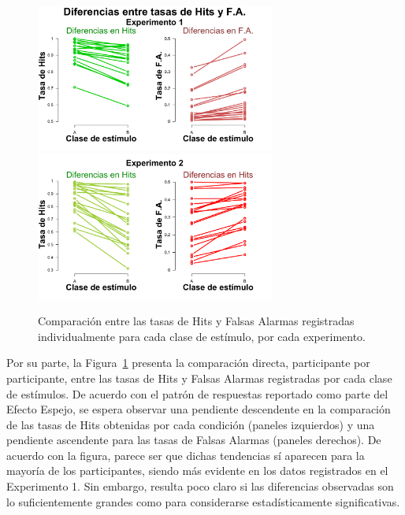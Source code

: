 \begin{figure}[h]
\centering
\includegraphics[width=0.7\textwidth]{Figures/Diff_Rate_E1}\\ 
\includegraphics[width=0.7\textwidth]{Figures/Diff_Rate_E2}\\
\decoRule
\caption[Resultados: Comparación entre las tasas de Hits y las tasas de Falsas Alarmas registradas por cada clase de estímulo]{Comparación entre las tasas de Hits y Falsas Alarmas registradas individualmente para cada clase de estímulo, por cada experimento.}
\label{fig:Diff_Rate}
\end{figure}

Por su parte, la Figura~\ref{fig:Diff_Rate} presenta la comparación directa, participante por participante, entre las tasas de Hits y Falsas Alarmas registradas por cada clase de estímulos. De acuerdo con el patrón de respuestas reportado como parte del Efecto Espejo, se espera observar una pendiente descendente en la comparación de las tasas de Hits obtenidas por cada condición (paneles izquierdos) y una pendiente ascendente para las tasas de Falsas Alarmas (paneles derechos). De acuerdo con la figura, parece ser que dichas tendencias sí aparecen para la mayoría de los participantes, siendo más evidente en los datos registrados en el Experimento 1. Sin embargo, resulta poco claro si las diferencias observadas son lo suficientemente grandes como para considerarse estadísticamente significativas.\\

